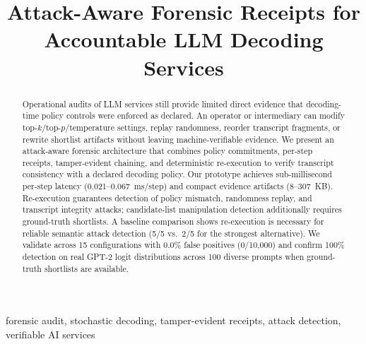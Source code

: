 \documentclass[conference]{IEEEtran}
\begin{document}
\title{Attack-Aware Forensic Receipts for Accountable LLM Decoding Services}

\author{
}

\maketitle

\begin{abstract}
Operational audits of LLM services still provide limited direct evidence that decoding-time policy controls were enforced as declared. An operator or intermediary can modify top-$k$/top-$p$/temperature settings, replay randomness, reorder transcript fragments, or rewrite shortlist artifacts without leaving machine-verifiable evidence. We present an attack-aware forensic architecture that combines policy commitments, per-step receipts, tamper-evident chaining, and deterministic re-execution to verify transcript consistency with a declared decoding policy. Our prototype achieves sub-millisecond per-step latency (0.021--0.067~ms/step) and compact evidence artifacts (8--307~KB). Re-execution guarantees detection of policy mismatch, randomness replay, and transcript integrity attacks; candidate-list manipulation detection additionally requires ground-truth shortlists. A baseline comparison shows re-execution is necessary for reliable semantic attack detection (5/5 vs.\ 2/5 for the strongest alternative). We validate across 15 configurations with 0.0\% false positives (0/10{,}000) and confirm 100\% detection on real GPT-2 logit distributions across 100 diverse prompts when ground-truth shortlists are available.
\end{abstract}

\begin{IEEEkeywords}
forensic audit, stochastic decoding, tamper-evident receipts, attack detection, verifiable AI services
\end{IEEEkeywords}
\end{document}
